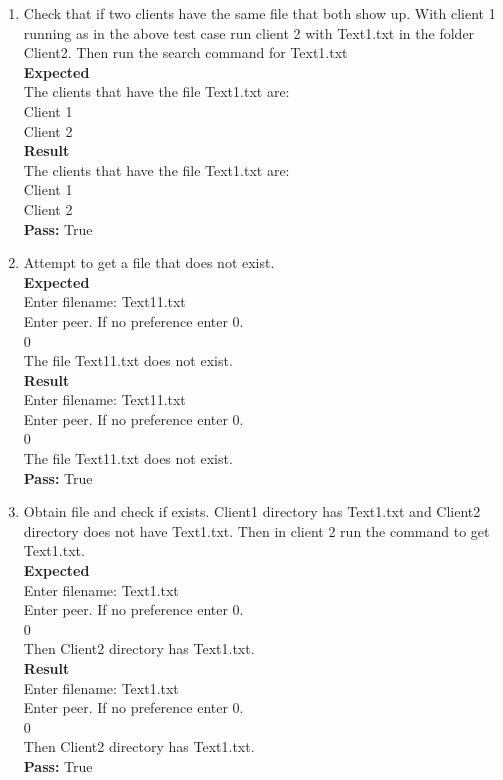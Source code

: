 \documentclass{article}
\begin{document}
\begin{enumerate}
\item Check that if two clients have the same file that both show up. With client 1 running as in the above test case run client 2 with Text1.txt in the folder Client2. Then run the search command for Text1.txt \\
\textbf{Expected}\\
The clients that have the file Text1.txt are:\\
Client 1\\
Client 2\\
\textbf{Result}\\
The clients that have the file Text1.txt are:\\
Client 1\\
Client 2\\
\textbf{Pass:} True\\

\item Attempt to get a file that does not exist.\\
\textbf{Expected}\\
Enter filename: Text11.txt\\
Enter peer. If no preference enter 0.\\
0\\
The file Text11.txt does not exist.\\
\textbf{Result}\\
Enter filename: Text11.txt\\
Enter peer. If no preference enter 0.\\
0\\
The file Text11.txt does not exist.\\
\textbf{Pass:} True\\

\item Obtain file and check if exists. Client1 directory has Text1.txt and Client2 directory does not have Text1.txt. Then in client 2 run the command to get Text1.txt.\\
\textbf{Expected}\\
Enter filename: Text1.txt\\
Enter peer. If no preference enter 0.\\
0\\
Then Client2 directory has Text1.txt. \\
\textbf{Result}\\
Enter filename: Text1.txt\\
Enter peer. If no preference enter 0.\\
0\\
Then Client2 directory has Text1.txt. \\
\textbf{Pass:} True\\


\end{enumerate}
\end{document}
